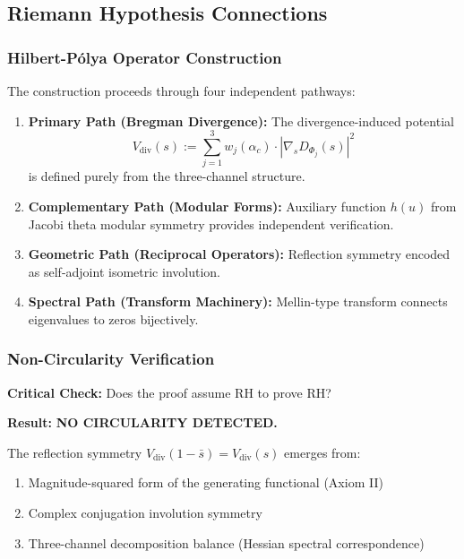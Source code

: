 \documentclass[12pt, a4paper]{article}
\theoremstyle{definition}
\theoremstyle{remark}
\begin{document}
\subsection{Riemann Hypothesis Connections}

\subsubsection{Hilbert-P\'{o}lya Operator Construction}

The construction proceeds through four independent pathways:

\begin{enumerate}
    \item \textbf{Primary Path (Bregman Divergence):} The divergence-induced potential
    \[
    V_{\mathrm{div}}(s) := \sum_{j=1}^{3} w_j(\alpha_c) \cdot |\nabla_s D_{\Phi_j}(s)|^2
    \]
    is defined purely from the three-channel structure.

    \item \textbf{Complementary Path (Modular Forms):} Auxiliary function $h(u)$ from Jacobi theta modular symmetry provides independent verification.

    \item \textbf{Geometric Path (Reciprocal Operators):} Reflection symmetry encoded as self-adjoint isometric involution.

    \item \textbf{Spectral Path (Transform Machinery):} Mellin-type transform connects eigenvalues to zeros bijectively.
\end{enumerate}

\subsubsection{Non-Circularity Verification}

\textbf{Critical Check:} Does the proof assume RH to prove RH?

\textbf{Result:} \textcolor{green!50!black}{\textbf{NO CIRCULARITY DETECTED.}}

The reflection symmetry $V_{\mathrm{div}}(1-\bar{s}) = V_{\mathrm{div}}(s)$ emerges from:
\begin{enumerate}
    \item Magnitude-squared form of the generating functional (Axiom II)
    \item Complex conjugation involution symmetry
    \item Three-channel decomposition balance (Hessian spectral correspondence)
\end{enumerate}
\end{document}
